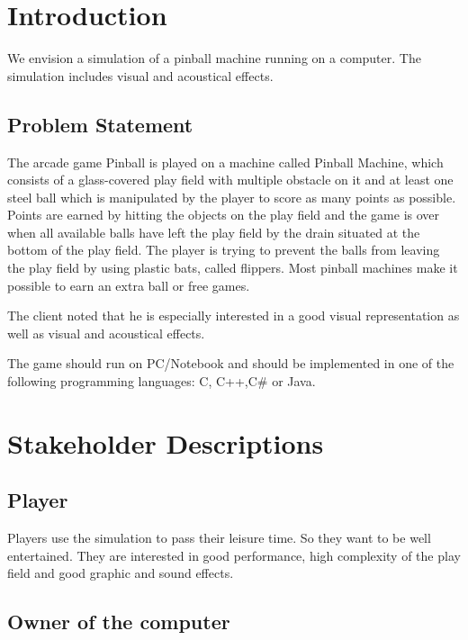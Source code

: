 \documentclass[fontsize=12pt,
               paper=a4,
               twoside=false,
               parskip=half,
               ]{scrartcl}
\begin{document}
\newcommand{\doctitle}{Vision}


\tableofcontents

\section{Introduction}

We envision a simulation of a pinball machine running on a computer. The simulation includes visual and acoustical effects.

\subsection{Problem Statement}

The arcade game Pinball is played on a machine called Pinball Machine, which consists of a glass-covered play field with multiple obstacle on it and at least one steel ball which is manipulated by the player to score as many points as possible. Points are earned by hitting the objects on the play field and the game is over when all available balls have left the play field by the drain situated at the bottom of the play field. The player is trying to prevent the balls from leaving the play field by using plastic bats, called flippers. Most pinball machines make it possible to earn an extra ball or free games.

The client noted that he is especially interested in a good visual representation as well as visual and acoustical effects.

The game should run on PC/Notebook and should be implemented in one of the following programming languages: C, C++,C\# or Java.


\section{Stakeholder Descriptions}	
	
\subsection{Player}

Players use the simulation to pass their leisure time. So they want to be well entertained. They are interested in good performance, high complexity of the play field and good graphic and sound effects.



\subsection{Owner of the computer}
\end{document}
